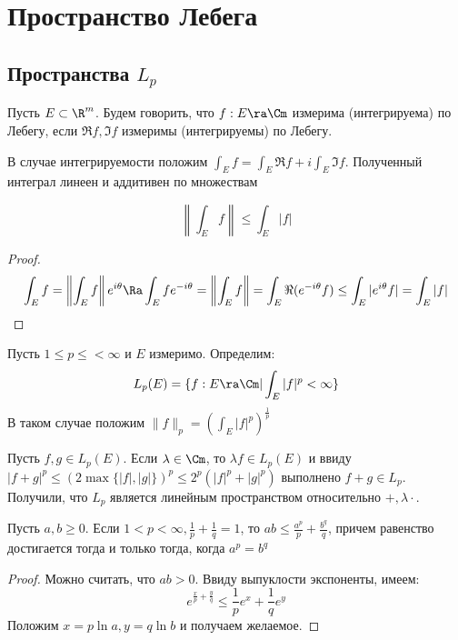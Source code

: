 


\section{Пространство Лебега}
\subsection{Пространства \(L_p\)}
\begin{definition}
    Пусть \(E \subset \R^m\). Будем говорить, что \(f: E \ra \Cm\) измерима (интегрируема) по Лебегу, если \(\Re f, \Im f\) измеримы (интегрируемы) по Лебегу.
\end{definition}

\begin{definition}
    В случае интегрируемости положим \(\int_E f = \int_E \Re f + i \int_E \Im f\). Полученный интеграл линеен и аддитивен по множествам
\end{definition}

\begin{note}
    \[\left\|\int_E f \right\| \le \int_E |f|\]
\end{note}
\begin{proof}
    \[\int_E f = \left\|\int_E f\right\| e^{i \theta} \Ra \int_E fe^{-i \theta} = \left\|\int_E f\right\| = \int_E \Re(e^{-i\theta} f) \le \int_E |e^{i\theta} f| = \int_E |f|\]
\end{proof}

\begin{definition}
    Пусть \(1 \le p \le < \infty\) и \(E\) измеримо. Определим:
    \[L_p(E) = \{f: E \ra \Cm | \int_E |f|^p < \infty\}\]
    В таком случае положим \(\|f\|_p = \left( \int_E |f|^p \right)^{\frac{1}{p}}\)
\end{definition}

Пусть \(f, g \in L_p(E)\). Если \(\lambda \in \Cm\), то \(\lambda f \in L_p(E)\) и ввиду \(|f + g|^p \le (2\max\{|f|, |g|\})^p \le 2^p(|f|^p + |g|^p)\) выполнено \(f + g \in L_p\). Получили, что \(L_p\) является линейным пространством относительно \(+, \lambda\cdot\).



\begin{lemma}
    Пусть \(a, b \ge 0\). Если \(1 < p < \infty, \frac{1}{p} + \frac{1}{q} = 1\), то \(ab \le \frac{a^p}{p} + \frac{b^q}{q}\), причем равенство достигается тогда и только тогда, когда \(a^p = b^q\)
\end{lemma}
\begin{proof}
    Можно считать, что \(ab > 0\). Ввиду выпуклости экспоненты, имеем:
    \[e^{\frac{x}{p} + \frac{y}{q}} \le \frac{1}{p}e^x + \frac{1}{q}e^y\]
    Положим \(x = p\ln a, y = q\ln b\) и получаем желаемое.
\end{proof}

